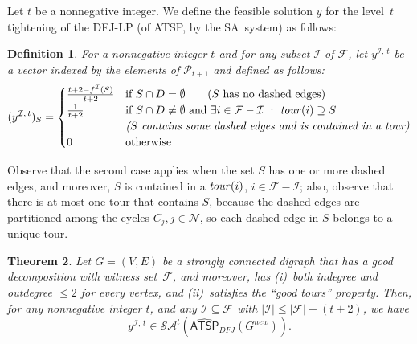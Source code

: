 \documentclass[11pt]{article}
\newtheorem{theorem}{Theorem}[section]
\newtheorem{definition}[theorem]{Definition}
\newcommand{\iSA}{\textsf{SA}}
\newcommand{\atspdfjpolytope}{\widehat{\textsf{ATSP}}_{\mathit{DFJ}}}
\newcommand{\cindset}{\mathcal{N}}
\newcommand{\fracset}{\mathcal{F}}
\newcommand{\sgn}{\mathcal{I}}
\newcommand{\yvec}[2]{y^{#1,\,#2}}	\newcommand{\zvec}[2]{y^{#1,\,#2}}	\newcommand{\zveconly}{y}
\newcommand{\saop}{\mathcal{SA}}
\newcommand{\homog}[1]{{#1}}
\begin{document}
Let $t$ be a nonnegative integer.
We define the feasible solution $\zveconly$ for
the level~$t$ tightening of the DFJ-LP
(of ATSP, by the \iSA\ system)
as follows:
\begin{definition}\label{def:dfj-feasol}
For a nonnegative integer $t$ and
for any subset $\sgn$ of $\fracset$,
let $\yvec{\sgn}{t}$ be a vector indexed by the elements of
$\mathcal{P}_{t+1}$ and defined as follows:
\label{def:dfj-zvec}
\begin{align}
(\zvec{\sgn}{t})_S =
 \begin{cases}
	\frac{t+2-\szgoodfrac{\sgn}{S}}{t+2} & \textup{if~} S\cap D = \emptyset
		\qquad \textup{($S$ has no dashed edges)} \\
	\frac{1}{t+2} & \textup{if~} S\cap D \not= \emptyset \textup{~and~}
		\exists i\in \fracset - \sgn ~:~ \tour(i) \supseteq S \\
		& \hspace{-0.7cm}
		\qquad
 \textup{\textit{($S$ contains some dashed edges and is contained in a tour)}} \\
	0 & \textup{otherwise}
 \end{cases}
\end{align}
\end{definition}


Observe that the second case applies when
the set $S$ has one or more dashed edges,
and moreover, $S$ is contained in a
$\textit{tour\/}(i)$, $i\in\fracset - \sgn$;
also, observe that there is at most one tour that contains $S$,
because the dashed edges are partitioned among the cycles $C_j,j\in\cindset$,
so each dashed edge in $S$ belongs to a unique tour.


\begin{theorem}
\label{thm:dfj-feasible}
Let $G=(V,E)$ be a strongly connected digraph that
has a good decomposition with witness set~$\fracset$,
and moreover,
has (i)~both indegree and outdegree $\le2$ for every vertex,
and (ii)~satisfies the ``good tours'' property.
Then, for any nonnegative integer $t$, and
any $\sgn\subseteq\fracset$ with $|\sgn|\le|\fracset| - (t+2)$,
we have
\[ \zvec{\sgn}{t} \in \saop^t(\homog{\atspdfjpolytope(G^{new})}).
\]
\end{theorem}
\end{document}
